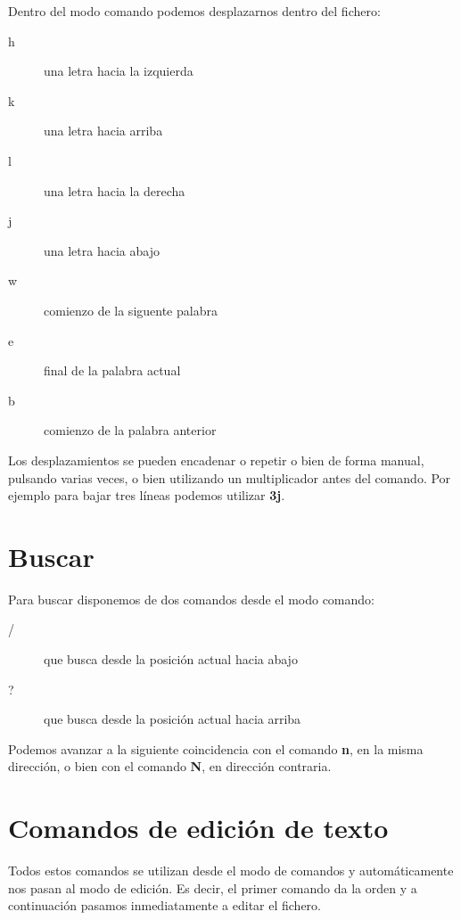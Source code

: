 Dentro del modo comando podemos desplazarnos dentro del fichero:

\begin{description}
    \item[h] una letra hacia la izquierda
    \item[k] una letra hacia arriba
    \item[l] una letra hacia la derecha
    \item[j] una letra hacia abajo
    \item[w] comienzo de la siguente palabra
    \item[e] final de la palabra actual
    \item[b] comienzo de la palabra anterior
\end{description}

Los desplazamientos se pueden encadenar o repetir o bien de forma manual,
pulsando varias veces, o bien utilizando un multiplicador antes del comando.
Por ejemplo para bajar tres líneas podemos utilizar \textbf{3j}.


\section{Buscar} %
\label{sec:Buscar}

Para buscar disponemos de dos comandos desde el modo comando:

\begin{description}
    \item[/] que busca desde la posición actual hacia abajo
    \item[?] que busca desde la posición actual hacia arriba
\end{description}

Podemos avanzar a la siguiente coincidencia con el comando \textbf{n}, en la
misma dirección, o bien con el comando \textbf{N}, en dirección contraria.


\section{Comandos de edición de texto} %
\label{sec:Comandos de edicion de texto}

Todos estos comandos se utilizan desde el modo de comandos y automáticamente
nos pasan al modo de edición. Es decir, el primer comando da la orden y a
continuación pasamos inmediatamente a editar el fichero.

